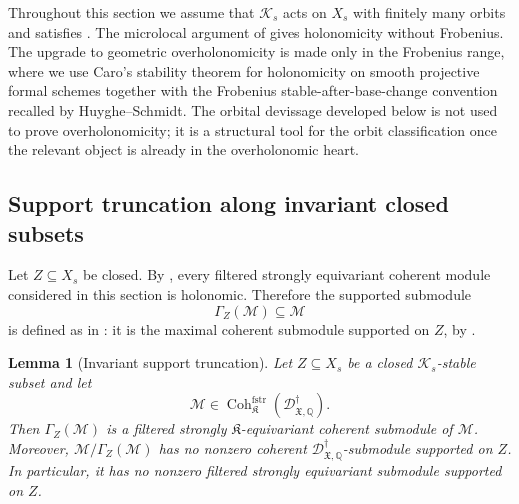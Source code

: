 \documentclass[11pt]{amsart}
\theoremstyle{plain}
\newtheorem{lemma}{Lemma}[section]
\theoremstyle{definition}
\theoremstyle{remark}
\newcommand{\Coh}{\operatorname{Coh}}
\newcommand{\fstr}{\mathrm{fstr}}
\begin{document}
Throughout this section we assume that \(\mathcal K_s\) acts on \(X_s\) with
finitely many orbits and satisfies .  The
microlocal argument of  gives holonomicity without
Frobenius.  The upgrade to geometric overholonomicity is made only in the
Frobenius range, where we use Caro's stability theorem for holonomicity on smooth projective formal schemes together
with the Frobenius stable-after-base-change convention recalled by Huyghe--Schmidt.  The
orbital devissage developed below is not used to prove overholonomicity; it is
a structural tool for the orbit classification once the relevant object is
already in the overholonomic heart.

\subsection{Support truncation along invariant closed subsets}

Let \(Z\subseteq X_s\) be closed.  By
, every filtered strongly equivariant coherent
module considered in this section is holonomic.  Therefore the supported submodule
\[
  \Gamma_Z(\mathcal M)\subseteq \mathcal M
\]
is defined as in : it is the maximal coherent
submodule supported on \(Z\), by .

\begin{lemma}[Invariant support truncation]
\label{lem:invariant-support-truncation}
Let \(Z\subseteq X_s\) be a closed \(\mathcal K_s\)-stable subset and let
\[
  \mathcal M\in
  \Coh^{\fstr}_{\mathfrak K}
  (\mathscr D^\dagger_{\mathfrak X,\mathbb Q}).
\]
Then \(\Gamma_Z(\mathcal M)\) is a filtered strongly \(\mathfrak K\)-equivariant
coherent submodule of \(\mathcal M\).  Moreover,
\(\mathcal M/\Gamma_Z(\mathcal M)\) has no nonzero coherent
\(\mathscr D^\dagger_{\mathfrak X,\mathbb Q}\)-submodule supported on
\(Z\).  In particular, it has no nonzero filtered strongly equivariant submodule
supported on \(Z\).
\end{lemma}
\end{document}
